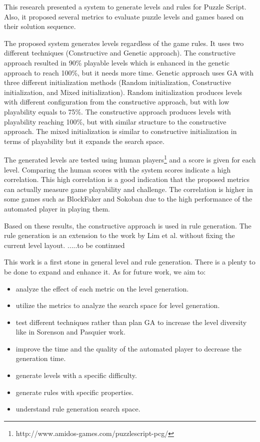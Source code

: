 This research presented a system to generate levels and rules for Puzzle Script. Also, it proposed several metrics to evaluate puzzle levels and games based on their solution sequence.\\\par

The proposed system generates levels regardless of the game rules. It uses two different techniques (Constructive and Genetic approach). The constructive approach resulted in 90\% playable levels which is enhanced in the genetic approach to reach 100\%, but it needs more time. Genetic approach uses GA with three different initialization methods (Random initialization, Constructive initialization, and Mixed initialization). Random initialization produces levels with different configuration from the constructive approach, but with low playability equals to 75\%.  The constructive approach produces levels with playability reaching 100\%, but with similar structure to the constructive approach. The mixed initialization is similar to constructive initialization in terms of playability but it expands the search space.\\\par

The generated levels are tested using human players\footnote{http://www.amidos-games.com/puzzlescript-pcg/} and a score is given for each level. Comparing the human scores with the system scores indicate a high correlation. This high correlation is a good indication that the proposed metrics can actually measure game playability and challenge. The correlation is higher in some games such as BlockFaker and Sokoban due to the high performance of the automated player in playing them.\\\par

Based on these results, the constructive approach is used in rule generation. The rule generation is an extension to the work by Lim et al.\cite{puzzleScriptGeneration} without fixing the current level layout. .....to be continued\\\par

This work is a first stone in general level and rule generation. There is a plenty to be done to expand and enhance it. As for future work, we aim to:
\begin{itemize} \itemsep0pt \parskip0pt 
	\item analyze the effect of each metric on the level generation.
	\item utilize the metrics to analyze the search space for level generation.
	\item test different techniques rather than plan GA to increase the level diversity like in Sorenson and Pasquier work\cite{genericLevelFramework}.
	\item improve the time and the quality of the automated player to decrease the generation time.
	\item generate levels with a specific difficulty.
	\item generate rules with specific properties.
	\item understand rule generation search space.
\end{itemize}